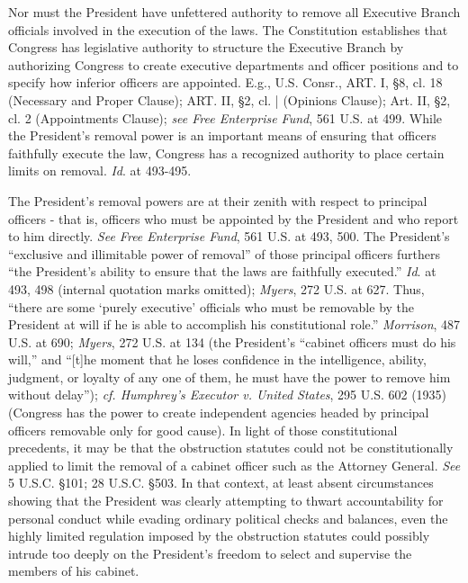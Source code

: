 Nor must the President have unfettered authority to remove all Executive Branch officials involved in the execution of the laws.
The Constitution establishes that Congress has legislative authority to structure the Executive Branch by authorizing Congress to create executive departments and officer positions and to specify how inferior officers are appointed.
E.g., U.S. Consr., ART. I, \S 8, cl. 18 (Necessary and Proper Clause); ART. II, \S 2, cl. | (Opinions Clause); Art. II, \S 2, cl. 2 (Appointments Clause);
\textit{see Free Enterprise Fund}, 561 U.S. at 499. While the President’s removal power is an important means of ensuring that officers faithfully execute the law, Congress has a recognized authority to place certain limits on removal.
\textit{Id}. at 493-495.

The President’s removal powers are at their zenith with respect to principal officers - that is, officers who must be appointed by the President and who report to him directly.
\textit{See Free Enterprise Fund}, 561 U.S. at 493, 500.
The President’s “exclusive and illimitable power of removal” of those principal officers furthers “the President’s ability to ensure that the laws are faithfully executed.”
\textit{Id}. at 493, 498 (internal quotation marks omitted);
\textit{Myers}, 272 U.S. at 627.
Thus, “there are some ‘purely executive’ officials who must be removable by the President at will if he is able to accomplish his constitutional role.”
\textit{Morrison}, 487 U.S. at 690;
\textit{Myers}, 272 U.S. at 134 (the President’s “cabinet officers must do his will,” and “[t]he moment that he loses confidence in the intelligence, ability, judgment, or loyalty of any one of them, he must have the power to remove him without delay”);
\textit{cf. Humphrey’s Executor v. United States}, 295 U.S. 602 (1935) (Congress has the power to create independent agencies headed by principal officers removable only for good cause).
In light of those constitutional precedents, it may be that the obstruction statutes could not be constitutionally applied to limit the removal of a cabinet officer such as the Attorney General.
\textit{See} 5 U.S.C. \S 101; 28 U.S.C. \S 503.
In that context, at least absent circumstances showing that the President was clearly attempting to thwart accountability for personal conduct while evading ordinary political checks and balances, even the highly limited regulation imposed by the obstruction statutes could possibly intrude too deeply on the President’s freedom to select and supervise the members of his cabinet.

